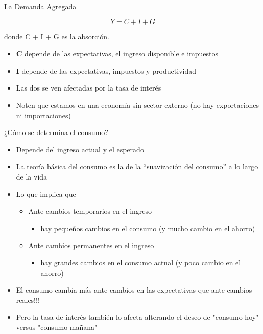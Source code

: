 \documentclass{beamer}
\begin{document}
\begin{frame}{La Demanda Agregada}
\begin{itemize}
\begin{tcolorbox}[width=4in,
                  interior hidden,
                  boxsep=0pt,
                  left=0pt,
                  right=0pt,
                  top=2pt,
                  ]%
$$ Y = C + I + G $$
\end{tcolorbox}
    \end{itemize}
\centering donde C + I + G es la absorción.
\vspace{1cm}
\begin{itemize}
        \item \textbf{C} depende de las expectativas, el ingreso disponible e impuestos
        \item \textbf{I} depende de las expectativas, impuestos y productividad
        \item Las dos se ven afectadas por la tasa de interés
        \item Noten que estamos en una economía sin sector externo (no hay exportaciones ni importaciones)
\end{itemize}
\end{frame}

\begin{frame}{¿Cómo se determina el consumo?}
    \begin{itemize}
        \item Depende del ingreso actual y el esperado
        \item La teoría básica del consumo es la de la “suavización del consumo” a lo largo de la vida
        \item Lo que implica que 
            \begin{itemize}
            \item Ante cambios temporarios en el ingreso
                \begin{itemize}
                \item hay pequeños cambios en el consumo (y mucho cambio en el ahorro)
                \end{itemize}            
            \item Ante cambios permanentes en el ingreso
                \begin{itemize}
                \item hay grandes cambios en el consumo actual (y poco cambio en el ahorro)
                \end{itemize}
            \end{itemize}
        \item El consumo cambia más ante cambios en las expectativas que ante cambios reales!!!
        \item Pero la tasa de interés también lo afecta alterando el deseo de "consumo hoy" versus "consumo mañana"
    \end{itemize}
\end{frame}
\end{document}
